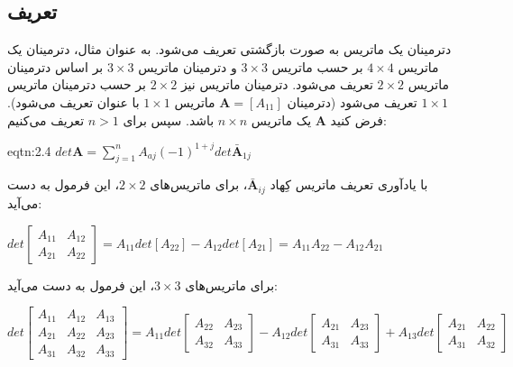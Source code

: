 
\subsection{\textbf{تعریف}}
\label{subsec:2.5.2}
{
    \Large
    \begin{spacing}{1.3}
        دترمینان یک ماتریس به صورت بازگشتی تعریف می‌شود.
        به عنوان مثال، دترمینان یک ماتریس $4\times 4$ بر حسب ماتریس $3\times 3$ و دترمینان ماتریس $3\times 3$ بر اساس دترمینان ماتریس $2\times 2$ تعریف می‌شود.
        دترمینان ماتریس نیز $2\times 2$ بر حسب دترمینان ماتریس $1\times 1$ تعریف می‌شود
        (دترمینان $\textbf{A}=[A_{11}]$ ماتریس $1\times 1$ با عنوان  تعریف می‌شود).
        فرض کنید $\textbf{A}$ یک ماتریس $n\times n$ باشد. سپس برای $n>1$ تعریف می‌کنیم:

        \begin{eqtn}{eqtn:2.4}
            \centering
            $det\textbf{A}=\sum\limits_{j=1}^{n}A_{aj}(-1)^{1+j}det\bar{\textbf{A}}_{1j}$
        \end{eqtn}

        با یادآوری تعریف ماتریس کِهاد $\bar{\textbf{A}}_{ij}$، برای ماتریس‌های $2\times 2$، این فرمول به دست می‌آید:

        \begin{center}
            $det\begin{bmatrix}
                    A_{11} & A_{12} \\
                    A_{21} & A_{22}
            \end{bmatrix}=A_{11}det[A_{22}]-A_{12}det[A_{21}]=A_{11}A_{22}-A_{12}A_{21}$
        \end{center}

        برای ماتریس‌های $3\times 3$، این فرمول به دست می‌آید:

        \begin{flushleft}
            $det\begin{bmatrix}
                    A_{11} & A_{12} & A_{13} \\
                    A_{21} & A_{22} & A_{23} \\
                    A_{31} & A_{32} & A_{33}
            \end{bmatrix}=A_{11}det\begin{bmatrix}
                                       A_{22} & A_{23} \\
                                       A_{32} & A_{33}
            \end{bmatrix}-A_{12}det\begin{bmatrix}
                                       A_{21} & A_{23} \\
                                       A_{31} & A_{33}
            \end{bmatrix}+A_{13}det\begin{bmatrix}
                                       A_{21} & A_{22} \\
                                       A_{31} & A_{32}
            \end{bmatrix}$
        \end{flushleft}


\end{spacing}}
